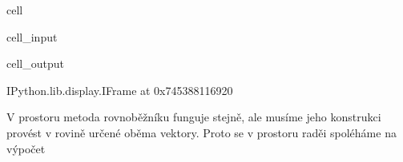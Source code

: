 \documentclass[letterpaper,10pt,english]{jupyterBook}
\begin{document}
\begin{sphinxuseclass}{cell}\begin{sphinxVerbatimInput}

\begin{sphinxuseclass}{cell_input}
\begin{sphinxVerbatim}[commandchars=\\\{\}]
  
\end{sphinxVerbatim}

\end{sphinxuseclass}\end{sphinxVerbatimInput}
\begin{sphinxVerbatimOutput}

\begin{sphinxuseclass}{cell_output}
\begin{sphinxVerbatim}[commandchars=\\\{\}]
\PYGZlt{}IPython.lib.display.IFrame at 0x745388116920\PYGZgt{}
\end{sphinxVerbatim}

\end{sphinxuseclass}\end{sphinxVerbatimOutput}

\end{sphinxuseclass}
\sphinxAtStartPar
V prostoru metoda rovnoběžníku funguje stejně, ale musíme jeho konstrukci provést v rovině určené oběma vektory. Proto se v prostoru raděi spoléháme na výpočet
\end{document}

